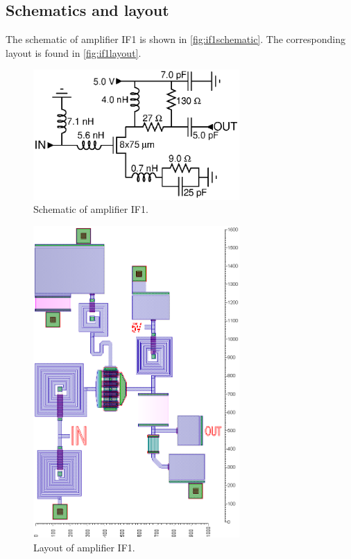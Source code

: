		\subsection{Schematics and layout}
			The schematic of amplifier IF1 is shown in \autoref{fig:if1schematic}. The corresponding layout is found in \autoref{fig:if1layout}.
			
			\begin{figure}[hbt!]
				\centering
				\includegraphics[width=0.7\textwidth]{fig/amplifiers/if1/sch_if1}
				\caption[Amplifier IF1 schematic.]{Schematic of amplifier IF1.}\label{fig:if1schematic}
			\end{figure}

			\begin{figure}[hbt!]
				\centering
				\includegraphics[width=0.7\textwidth]{fig/amplifiers/if1/layout}
				\caption[Amplifier IF1 layout.]{Layout of amplifier IF1.\scalemum}\label{fig:if1layout}
			\end{figure}

